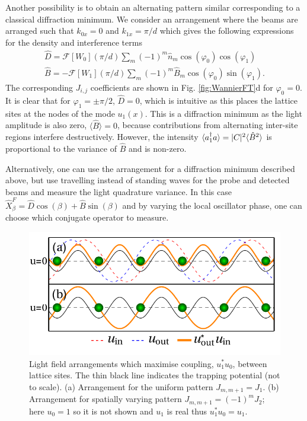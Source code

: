 Another possibility is to obtain an alternating pattern similar
corresponding to a classical diffraction minimum. We consider an
arrangement where the beams are arranged such that $k_{0x} = 0$ and
$k_{1x} = \pi/d$ which gives the following expressions for the density
and interference terms
\begin{eqnarray}
  \label{eq:DMin}
	\hat{D} = \mathcal{F}[W_0](\pi/d) \sum_m (-1)^m \hat{n}_m
        \cos(\varphi_0) \cos(\varphi_1) \nonumber \\ \hat{B} =
        -\mathcal{F}[W_1](\pi/d) \sum_m (-1)^m \hat{B}_m
        \cos(\varphi_0) \sin(\varphi_1).
\end{eqnarray}
The corresponding $J_{i,j}$ coefficients are shown in
Fig. \ref{fig:WannierFT}d for $\varphi_0=0$. It is clear that for
$\varphi_1 = \pm \pi/2$, $\hat{D} = 0$, which is intuitive as this
places the lattice sites at the nodes of the mode $u_1(x)$. This is a
diffraction minimum as the light amplitude is also zero, $\langle
\hat{B} \rangle = 0$, because contributions from alternating
inter-site regions interfere destructively. However, the intensity
$\langle a^\dagger_1 a \rangle = |C|^2 \langle \hat{B}^2 \rangle$ is
proportional to the variance of $\hat{B}$ and is non-zero. 

Alternatively, one can use the arrangement for a diffraction minimum
described above, but use travelling instead of standing waves for the
probe and detected beams and measure the light quadrature variance. In
this case $\hat{X}^F_\beta = \hat{D} \cos(\beta) + \hat{B}
\sin(\beta)$ and by varying the local oscillator phase, one can choose
which conjugate operator to measure.

\begin{figure}[hbtp!]
	\includegraphics[width=\linewidth]{BDiagram}
	\caption[Maximising Light-Matter Coupling between Lattice
          Sites]{Light field arrangements which maximise coupling,
          $u_1^*u_0$, between lattice sites. The thin black line
          indicates the trapping potential (not to scale). (a)
          Arrangement for the uniform pattern $J_{m,m+1} = J_1$. (b)
          Arrangement for spatially varying pattern $J_{m,m+1}=(-1)^m
          J_2$; here $u_0=1$ so it is not shown and $u_1$ is real thus
          $u_1^*u_0=u_1$. \label{fig:BDiagram}}
\end{figure}

